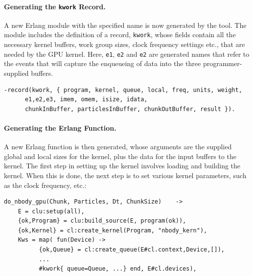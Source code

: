 \documentclass[final]{jfp1}
\begin{document}


\paragraph{Generating the \texttt{kwork} Record.}
A new Erlang module with the specified name is now generated by the tool.
The module includes the definition of a record, \lstinline{kwork}, whose
fields contain all the necessary kernel buffers, work group
sizes, clock frequency settings etc., that are needed by the GPU kernel. Here,
\lstinline{e1}, \lstinline{e2} and \lstinline{e2} are generated names
that refer to the events that will capture the enqueueing of data into the
three programmer-supplied buffers.

\begin{lstlisting}
-record(kwork, { program, kernel, queue, local, freq, units, weight,  
	  e1,e2,e3, imem, omem, isize, idata, 
	  chunkInBuffer, particlesInBuffer, chunkOutBuffer, result }).
\end{lstlisting}

\paragraph{Generating the Erlang Function.} 
A new Erlang function is then generated, whose arguments are the 
supplied global and local sizes for the kernel, plus the data for the
input buffers to the kernel. The first step in setting up the kernel
involves loading and building the kernel. When this is done, the next step
is to set various kernel parameters, such as the clock frequency, etc.:


\begin{lstlisting}
do_nbody_gpu(Chunk, Particles, Dt, ChunkSize)	 ->
    E = clu:setup(all),
    {ok,Program} = clu:build_source(E, program(ok)),
    {ok,Kernel} = cl:create_kernel(Program, "nbody_kern"),
    Kws = map( fun(Device) ->
		  {ok,Queue} = cl:create_queue(E#cl.context,Device,[]),
		  ...
		  #kwork{ queue=Queue, ...} end, E#cl.devices),
\end{lstlisting}
\end{document}
